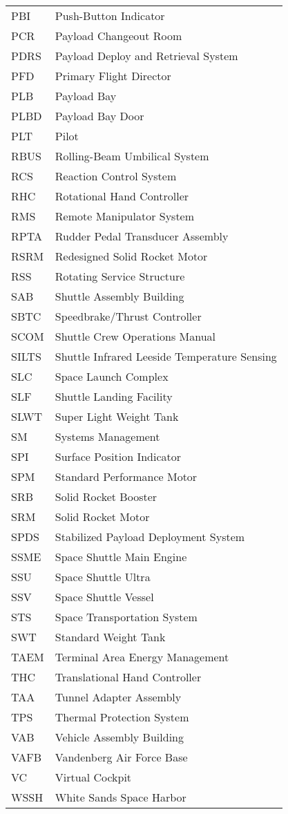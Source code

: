 \documentclass[Space_Shuttle_Vessel_Manual.tex]{subfiles}
\begin{document}
\begin{longtable}{l l }
PBI & Push-Button Indicator\\
PCR & Payload Changeout Room\\
PDRS & Payload Deploy and Retrieval System\\
PFD & Primary Flight Director\\
PLB & Payload Bay\\
PLBD & Payload Bay Door\\
PLT & Pilot\\
RBUS & Rolling-Beam Umbilical System\\
RCS & Reaction Control System\\
RHC & Rotational Hand Controller\\
RMS & Remote Manipulator System\\
RPTA & Rudder Pedal Transducer Assembly\\
RSRM & Redesigned Solid Rocket Motor\\
RSS & Rotating Service Structure\\
SAB & Shuttle Assembly Building\\
SBTC & Speedbrake/Thrust Controller\\
SCOM & Shuttle Crew Operations Manual\\
SILTS & Shuttle Infrared Leeside Temperature Sensing\\
SLC & Space Launch Complex\\
SLF & Shuttle Landing Facility\\
SLWT & Super Light Weight Tank\\
SM & Systems Management\\
SPI & Surface Position Indicator\\
SPM & Standard Performance Motor\\
SRB & Solid Rocket Booster\\
SRM & Solid Rocket Motor\\
SPDS & Stabilized Payload Deployment System\\
SSME & Space Shuttle Main Engine\\
SSU & Space Shuttle Ultra\\
SSV & Space Shuttle Vessel\\
STS & Space Transportation System\\
SWT & Standard Weight Tank\\
TAEM & Terminal Area Energy Management\\
THC & Translational Hand Controller\\
TAA & Tunnel Adapter Assembly\\
TPS & Thermal Protection System\\
VAB & Vehicle Assembly Building\\
VAFB & Vandenberg Air Force Base\\
VC & Virtual Cockpit\\
WSSH & White Sands Space Harbor\\
\end{longtable}
\end{document}
